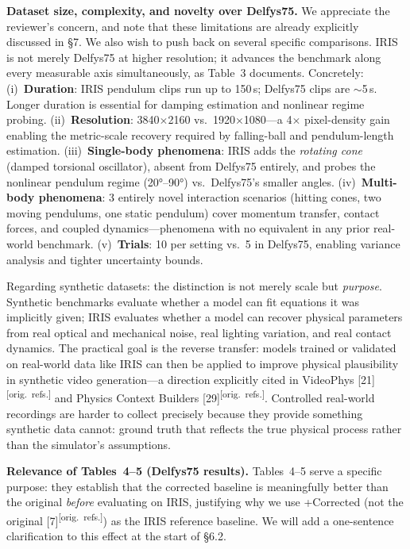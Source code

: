 \documentclass[10pt,twocolumn,letterpaper]{article}
\newcommand{\origref}{\textsuperscript{\normalfont\scriptsize[orig.\ refs.]}}
\begin{document}
\noindent\textbf{Dataset size, complexity, and novelty over Delfys75.}
We appreciate the reviewer's concern, and note that these limitations are already explicitly discussed in \S7. We also wish to push back on several specific comparisons. IRIS is not merely Delfys75 at higher resolution; it advances the benchmark along every measurable axis simultaneously, as Table~3 documents. Concretely:
(i)~\textbf{Duration}: IRIS pendulum clips run up to 150\,s; Delfys75 clips are $\sim$5\,s. Longer duration is essential for damping estimation and nonlinear regime probing.
(ii)~\textbf{Resolution}: 3840$\times$2160 vs.\ 1920$\times$1080—a 4$\times$ pixel-density gain enabling the metric-scale recovery required by falling-ball and pendulum-length estimation.
(iii)~\textbf{Single-body phenomena}: IRIS adds the \emph{rotating cone} (damped torsional oscillator), absent from Delfys75 entirely, and probes the nonlinear pendulum regime (20°--90°) vs.\ Delfys75's smaller angles.
(iv)~\textbf{Multi-body phenomena}: 3 entirely novel interaction scenarios (hitting cones, two moving pendulums, one static pendulum) cover momentum transfer, contact forces, and coupled dynamics—phenomena with no equivalent in any prior real-world benchmark.
(v)~\textbf{Trials}: 10 per setting vs.\ 5 in Delfys75, enabling variance analysis and tighter uncertainty bounds.

Regarding synthetic datasets: the distinction is not merely scale but \emph{purpose}. Synthetic benchmarks evaluate whether a model can fit equations it was implicitly given; IRIS evaluates whether a model can recover physical parameters from real optical and mechanical noise, real lighting variation, and real contact dynamics. The practical goal is the reverse transfer: models trained or validated on real-world data like IRIS can then be applied to improve physical plausibility in synthetic video generation---a direction explicitly cited in VideoPhys [21]\origref{} and Physics Context Builders [29]\origref{}. Controlled real-world recordings are harder to collect precisely because they provide something synthetic data cannot: ground truth that reflects the true physical process rather than the simulator's assumptions.

\noindent\textbf{Relevance of Tables~4--5 (Delfys75 results).}
Tables~4--5 serve a specific purpose: they establish that the corrected baseline is meaningfully better than the original \emph{before} evaluating on IRIS, justifying why we use +Corrected (not the original [7]\origref{})
as the IRIS reference baseline. We will add a one-sentence clarification to this effect at the start of \S6.2.
\end{document}
